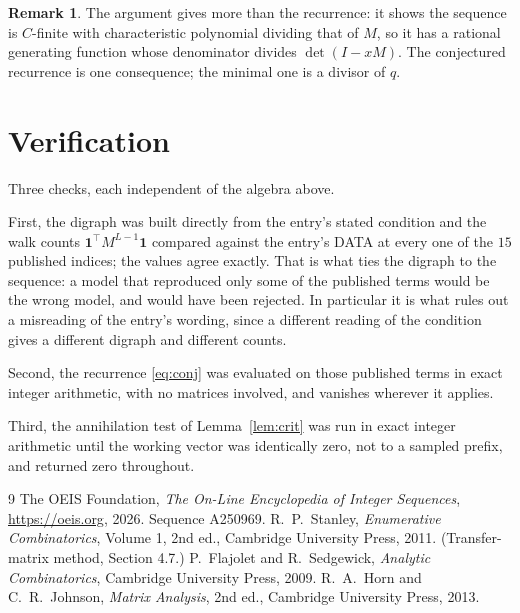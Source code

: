 \documentclass[11pt,a4paper]{article}
\theoremstyle{plain}
\theoremstyle{definition}
\newtheorem{remark}[theorem]{Remark}
\begin{document}
\begin{remark}
The argument gives more than the recurrence: it shows the sequence is $C$-finite with
characteristic polynomial dividing that of $M$, so it has a rational generating function
whose denominator divides $\det(I-xM)$. The conjectured recurrence is one consequence; the
minimal one is a divisor of $q$.
\end{remark}

\section{Verification}

Three checks, each independent of the algebra above.

First, the digraph was built directly from the entry's stated condition and the walk counts
$\mathbf{1}^{\!\top}M^{L-1}\mathbf{1}$ compared against the entry's DATA at
every one of the $15$ published indices; the values agree exactly. That is what ties
the digraph to the sequence: a model that reproduced only some of the published terms would
be the wrong model, and would have been rejected. In particular it is what rules out a
misreading of the entry's wording, since a different reading of the condition gives a
different digraph and different counts.

Second, the recurrence \eqref{eq:conj} was evaluated on those published terms in exact
integer arithmetic, with no matrices involved, and vanishes wherever it applies.

Third, the annihilation test of Lemma~\ref{lem:crit} was run in exact integer arithmetic
until the working vector was identically zero, not to a sampled prefix, and returned zero
throughout.

\begin{thebibliography}{9}
 The OEIS Foundation, \emph{The On-Line Encyclopedia of Integer
Sequences}, \url{https://oeis.org}, 2026. Sequence A250969.
 R.~P.~Stanley, \emph{Enumerative Combinatorics}, Volume 1, 2nd ed.,
Cambridge University Press, 2011. (Transfer-matrix method, Section 4.7.)
 P.~Flajolet and R.~Sedgewick, \emph{Analytic Combinatorics}, Cambridge
University Press, 2009.
 R.~A.~Horn and C.~R.~Johnson, \emph{Matrix Analysis}, 2nd ed., Cambridge
University Press, 2013.
\end{thebibliography}
\end{document}
